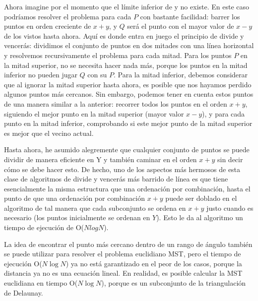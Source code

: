 Ahora imagine por el momento que el límite inferior de y no existe. En este caso podríamos resolver el problema para cada $P$ con bastante facilidad: barrer los puntos en orden creciente de $x + y$, y $Q$ será el punto con el mayor valor de $x - y$ de los vistos hasta ahora. Aquí es donde entra en juego el principio de divide y vencerás: dividimos el conjunto de puntos en dos mitades con una línea horizontal y resolvemos recursivamente el problema para cada mitad. Para los puntos $P$ en la mitad superior, no se necesita hacer nada más, porque los puntos en la mitad inferior no pueden jugar $Q$ con su $P$. Para la mitad inferior, debemos considerar que al ignorar la mitad superior hasta ahora, es posible que nos hayamos perdido algunos puntos más cercanos. Sin embargo, podemos tener en cuenta estos puntos de una manera similar a la anterior: recorrer todos los puntos en el orden $x + y$, siguiendo el mejor punto en la mitad superior (mayor valor $x - y$), y para cada punto en la mitad inferior, comprobando si este mejor punto de la mitad superior es mejor que el vecino actual.

Hasta ahora, he asumido alegremente que cualquier conjunto de puntos se puede dividir de manera eficiente en Y y también caminar en el orden $x + y$ sin decir cómo se debe hacer esto. De hecho, uno de los aspectos más hermosos de esta clase de algoritmos de divide y vencerás más barrido de línea es que tiene esencialmente la misma estructura que una ordenación por combinación, hasta el punto de que una ordenación por combinación $x + y$ puede ser doblado en el algoritmo de tal manera que cada subconjunto se ordena en $x + y$ justo cuando es necesario (los puntos inicialmente se ordenan en $Y$). Esto le da al algoritmo un tiempo de ejecución de O($N log N$).

La idea de encontrar el punto más cercano dentro de un rango de ángulo también se puede utilizar para resolver el problema euclidiano MST, pero el tiempo de ejecución O($N\log N$) ya no está garantizado en el peor de los casos, porque la distancia ya no es una ecuación lineal. En realidad, es posible calcular la MST euclidiana en tiempo O($N \log N$), porque es un subconjunto de la triangulación de Delaunay.
